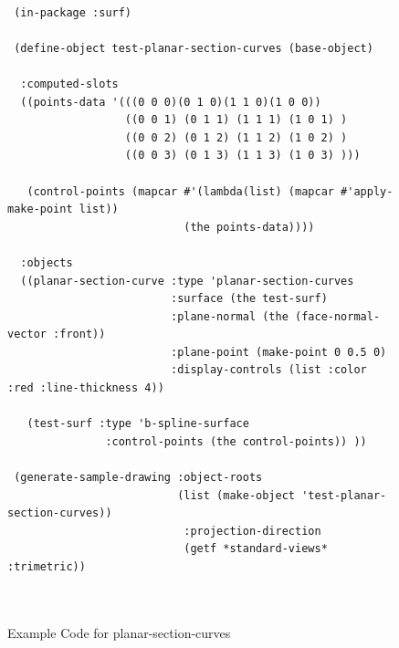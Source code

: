 \documentclass [11pt]{book}
\begin{document}
\begin{itemize}
\begin{description}
\end{description}




\begin{figure}
\begin{lrbox}{\boxedverb}
\begin{minipage}{\linewidth}
{\small

\begin{verbatim}

 (in-package :surf)
 
 (define-object test-planar-section-curves (base-object)
  
  :computed-slots
  ((points-data '(((0 0 0)(0 1 0)(1 1 0)(1 0 0))
                  ((0 0 1) (0 1 1) (1 1 1) (1 0 1) )
                  ((0 0 2) (0 1 2) (1 1 2) (1 0 2) )
                  ((0 0 3) (0 1 3) (1 1 3) (1 0 3) )))
   
   (control-points (mapcar #'(lambda(list) (mapcar #'apply-make-point list)) 
                           (the points-data))))
   
  :objects
  ((planar-section-curve :type 'planar-section-curves
                         :surface (the test-surf)
                         :plane-normal (the (face-normal-vector :front))
                         :plane-point (make-point 0 0.5 0)
                         :display-controls (list :color :red :line-thickness 4))
   
   (test-surf :type 'b-spline-surface 
               :control-points (the control-points)) ))

 (generate-sample-drawing :object-roots 
                          (list (make-object 'test-planar-section-curves))
                           :projection-direction 
                           (getf *standard-views* :trimetric))

 
\end{verbatim}}
\end{minipage}
\end{lrbox}
\fbox{\usebox{\boxedverb}}

\caption{Example Code for planar-section-curves}

\label{fig:example-code-planar-section-curves}

\end{figure}


\end{itemize}
\end{document}
